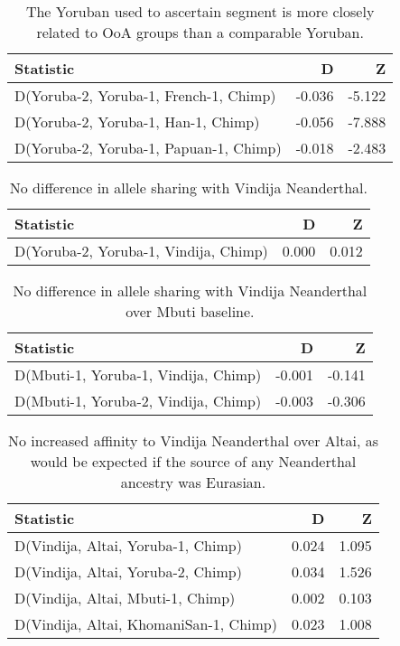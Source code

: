\begin{table}[ht]
\centering
\begin{tabular}{lrr}
  \hline
Statistic & D & Z \\ 
  \hline
D(Yoruba-2, Yoruba-1, French-1, Chimp) & -0.036 & -5.122 \\ 
  D(Yoruba-2, Yoruba-1, Han-1, Chimp) & -0.056 & -7.888 \\ 
  D(Yoruba-2, Yoruba-1, Papuan-1, Chimp) & -0.018 & -2.483 \\ 
   \hline
\end{tabular}
\caption{The Yoruban used to ascertain segment is more closely related to OoA groups than a comparable Yoruban.} 
\label{dstats:a3}
\end{table}
\begin{table}[ht]
\centering
\begin{tabular}{lrr}
  \hline
Statistic & D & Z \\ 
  \hline
D(Yoruba-2, Yoruba-1, Vindija, Chimp) & 0.000 & 0.012 \\ 
   \hline
\end{tabular}
\caption{No difference in allele sharing with Vindija Neanderthal.} 
\label{dstats:a4}
\end{table}
\begin{table}[ht]
\centering
\begin{tabular}{lrr}
  \hline
Statistic & D & Z \\ 
  \hline
D(Mbuti-1, Yoruba-1, Vindija, Chimp) & -0.001 & -0.141 \\ 
  D(Mbuti-1, Yoruba-2, Vindija, Chimp) & -0.003 & -0.306 \\ 
   \hline
\end{tabular}
\caption{No difference in allele sharing with Vindija Neanderthal over Mbuti baseline.} 
\label{dstats:a5}
\end{table}
\begin{table}[ht]
\centering
\begin{tabular}{lrr}
  \hline
Statistic & D & Z \\ 
  \hline
D(Vindija, Altai, Yoruba-1, Chimp) & 0.024 & 1.095 \\ 
  D(Vindija, Altai, Yoruba-2, Chimp) & 0.034 & 1.526 \\ 
  D(Vindija, Altai, Mbuti-1, Chimp) & 0.002 & 0.103 \\ 
  D(Vindija, Altai, KhomaniSan-1, Chimp) & 0.023 & 1.008 \\ 
   \hline
\end{tabular}
\caption{No increased affinity to Vindija Neanderthal over Altai, as would be expected if the source of any Neanderthal ancestry was Eurasian.} 
\label{dstats:a6}
\end{table}
